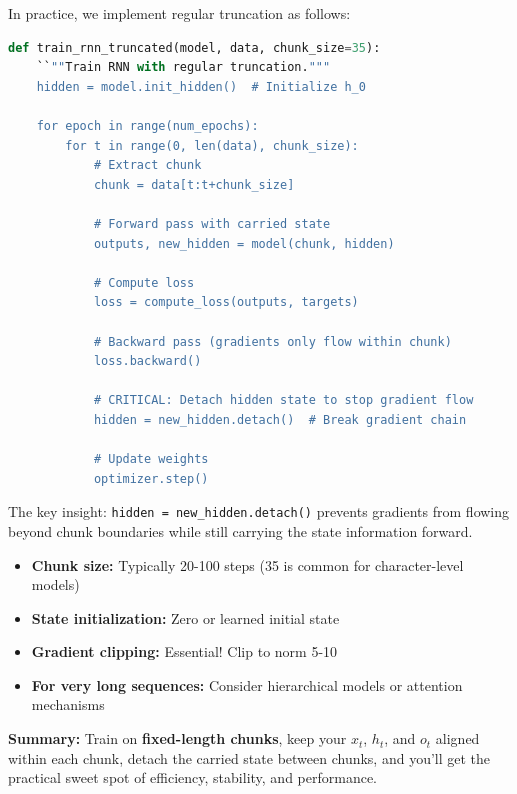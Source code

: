 \documentclass{article}
\begin{document}
In practice, we implement regular truncation as follows:

\begin{lstlisting}[language=Python, caption=Regular Truncation with Detached State Carrying]
def train_rnn_truncated(model, data, chunk_size=35):
    ``""Train RNN with regular truncation."""
    hidden = model.init_hidden()  # Initialize h_0
    
    for epoch in range(num_epochs):
        for t in range(0, len(data), chunk_size):
            # Extract chunk
            chunk = data[t:t+chunk_size]
            
            # Forward pass with carried state
            outputs, new_hidden = model(chunk, hidden)
            
            # Compute loss
            loss = compute_loss(outputs, targets)
            
            # Backward pass (gradients only flow within chunk)
            loss.backward()
            
            # CRITICAL: Detach hidden state to stop gradient flow
            hidden = new_hidden.detach()  # Break gradient chain
            
            # Update weights
            optimizer.step()
\end{lstlisting}

The key insight: \texttt{hidden = new\_hidden.detach()} prevents gradients from flowing beyond chunk boundaries while still carrying the state information forward.

\begin{tcolorbox}[colback=yellow!5!white, colframe=orange!50!black, title=Practical Recommendations]
\begin{itemize}
\item \textbf{Chunk size:} Typically 20-100 steps (35 is common for character-level models)
\item \textbf{State initialization:} Zero or learned initial state
\item \textbf{Gradient clipping:} Essential! Clip to norm 5-10
\item \textbf{For very long sequences:} Consider hierarchical models or attention mechanisms
\end{itemize}
\end{tcolorbox}

\textbf{Summary:} Train on \textbf{fixed-length chunks}, keep your $x_t$, $h_t$, and $o_t$ aligned within each chunk, detach the carried state between chunks, and you'll get the practical sweet spot of efficiency, stability, and performance.
\end{document}
